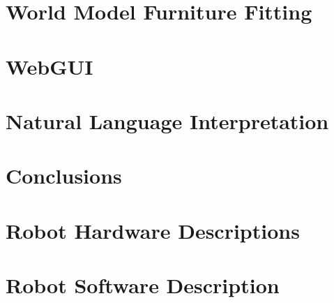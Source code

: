 \documentclass[runningheads,a4paper]{llncs}
\begin{document}
\section{World Model Furniture Fitting}\label{sec:wmfitting}


\section{WebGUI}\label{sec:webgui}

 
\section{Natural Language Interpretation}\label{sec:nli} 


%
%
%
%
%

\section{Conclusions}






\section*{Robot Hardware Descriptions}



\section*{Robot Software Description}

\end{document}
